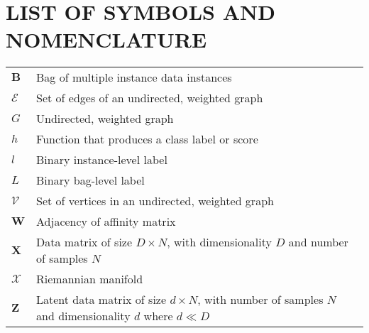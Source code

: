 

\chapter*{LIST OF SYMBOLS AND NOMENCLATURE}  %
\singlespacing
\begin{longtable}{l p{5in}} %

$\bm{B}$ & Bag of  multiple instance data instances \\
$\mathcal{E}$ & Set of edges of an undirected, weighted graph\\
$G$ & Undirected, weighted graph\\ 
$h$ & Function that produces a class label or score\\
$l$ & Binary instance-level label\\
$L$ & Binary bag-level label \\
$\mathcal{V}$ & Set of vertices in an undirected, weighted graph\\ 
$\bm{W}$ & Adjacency of affinity matrix\\
$\bm{X}$ & Data matrix of size $D \times N$, with dimensionality $D$ and number of samples  $N$ \\
$\mathcal{X}$ & Riemannian manifold\\
$\bm{Z}$ & Latent data matrix of size $d \times N$, with number of samples $N$ and dimensionality $d$ where $d \ll D$ \\

\end{longtable}


\doublespacing

